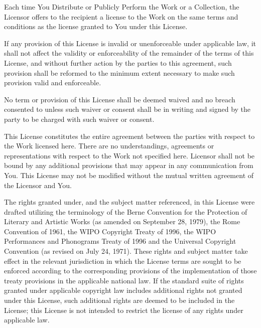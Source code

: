 \begin{doclicense@enumerate}
\item Each time You Distribute or Publicly Perform the Work
or a Collection, the Licensor offers to the recipient a
license to the Work on the same terms and conditions as
the license granted to You under this License.
\item If any provision of this License is invalid or
unenforceable under applicable law, it shall not affect
the validity or enforceability of the remainder of the
terms of this License, and without further action by the
parties to this agreement, such provision shall be
reformed to the minimum extent necessary to make such
provision valid and enforceable.
\item No term or provision of this License shall be deemed
waived and no breach consented to unless such waiver or
consent shall be in writing and signed by the party to be
charged with such waiver or consent.
\item This License constitutes the entire agreement between
the parties with respect to the Work licensed here. There
are no understandings, agreements or representations with
respect to the Work not specified here. Licensor shall
not be bound by any additional provisions that may appear
in any communication from You. This License may not be
modified without the mutual written agreement of the
Licensor and You.
\item The rights granted under, and the subject matter
referenced, in this License were drafted utilizing the
terminology of the Berne Convention for the Protection of
Literary and Artistic Works (as amended on September 28,
1979), the Rome Convention of 1961, the WIPO Copyright
Treaty of 1996, the WIPO Performances and Phonograms
Treaty of 1996 and the Universal Copyright Convention (as
revised on July 24, 1971). These rights and subject
matter take effect in the relevant jurisdiction in which
the License terms are sought to be enforced according to
the corresponding provisions of the implementation of
those treaty provisions in the applicable national law.
If the standard suite of rights granted under applicable
copyright law includes additional rights not granted
under this License, such additional rights are deemed to
be included in the License; this License is not intended
to restrict the license of any rights under applicable
law.
\end{doclicense@enumerate}

